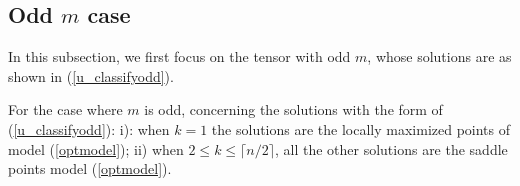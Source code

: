  \subsection{Odd  $m$ case}
 
 In this subsection, we first 
 focus on the tensor with  odd  $m$,
 whose solutions 
 are as shown in 
 (\ref{u_classifyodd}). 
\begin{lemma}\label{Theorem_structureoflocal}
	For the case where   $m$ is odd,  concerning  the solutions 
with the form of 
	(\ref{u_classifyodd}):
	i):
	 when  $k=1$ 
	 the solutions  are   the  locally maximized    points  of    model (\ref{optmodel});
	 ii)  when  $2 \le  k \le \lceil n/2  \rceil $, all the other solutions are  the saddle points  model (\ref{optmodel}). 
	
%	
	
\end{lemma}

